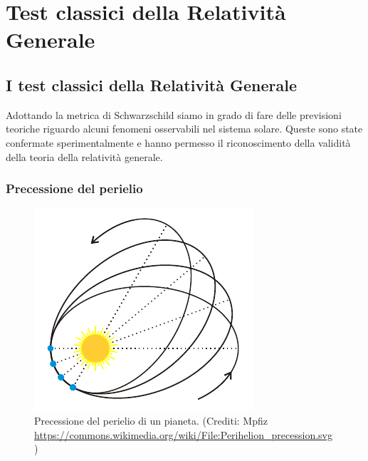 \cleardoublepage
\chapter{Test classici della Relatività Generale}
\label{cha:testclassici_rg}

\section{I test classici della Relatività Generale}
\label{sec:verififiche-relativita}

Adottando la metrica di Schwarzschild siamo in grado di fare delle previsioni
teoriche riguardo alcuni fenomeni osservabili nel sistema solare. Queste sono
state confermate sperimentalmente e hanno permesso il riconoscimento della
validità della teoria della relatività generale.

\subsection{Precessione del perielio}
\label{sec:precessione-perielio}

\begin{figure}
  \centering
  \includegraphics{figure/Perihelion_precession}
  \caption[Precessione del perielio di un pianeta]{Precessione del perielio di
    un pianeta.
    {\footnotesize (Crediti: Mpfiz
      \url{https://commons.wikimedia.org/wiki/File:Perihelion_precession.svg})}}
  \label{fig:precessione-perielio}
\end{figure}


